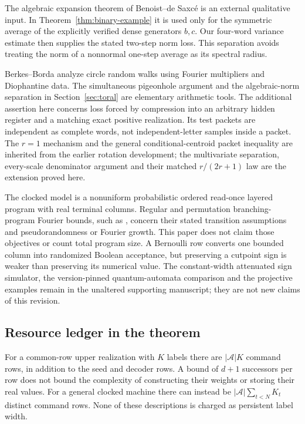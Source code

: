 The algebraic expansion theorem of Benoist--de Saxc\'e \cite[Theorem 1.2 and Definition 2.1]{BdS} is an external qualitative input. In Theorem~\ref{thm:binary-example} it is used only for the symmetric average of the explicitly verified dense generators $b,c$. Our four-word variance estimate then supplies the stated two-step norm loss. This separation avoids treating the norm of a nonnormal one-step average as its spectral radius.

Berkes--Borda \cite{BB} analyze circle random walks using Fourier multipliers and Diophantine data. The simultaneous pigeonhole argument and the algebraic-norm separation in Section~\ref{sec:toral} are elementary arithmetic tools. The additional assertion here concerns loss forced by compression into an arbitrary hidden register and a matching exact positive realization. Its test packets are independent as complete words, not independent-letter samples inside a packet. The $r=1$ mechanism and the general conditional-centroid packet inequality are inherited from the earlier rotation development; the multivariate separation, every-scale denominator argument and their matched $r/(2r+1)$ law are the extension proved here.

The clocked model is a nonuniform probabilistic ordered read-once layered program with real terminal columns. Regular and permutation branching-program Fourier bounds, such as \cite{RSV,SVW,LPV}, concern their stated transition assumptions and pseudorandomness or Fourier growth. This paper does not claim those objectives or count total program size. A Bernoulli row converts one bounded column into randomized Boolean acceptance, but preserving a cutpoint sign is weaker than preserving its numerical value. The constant-width attenuated sign simulator, the version-pinned quantum-automata comparison and the projective examples remain in the unaltered supporting manuscript; they are not new claims of this revision.

\subsection{Resource ledger in the theorem}
For a common-row upper realization with $K$ labels there are $|\mathcal A|K$ command rows, in addition to the seed and decoder rows. A bound of $d+1$ successors per row does not bound the complexity of constructing their weights or storing their real values. For a general clocked machine there can instead be $|\mathcal A|\sum_{t<N}K_t$ distinct command rows. None of these descriptions is charged as persistent label width.

